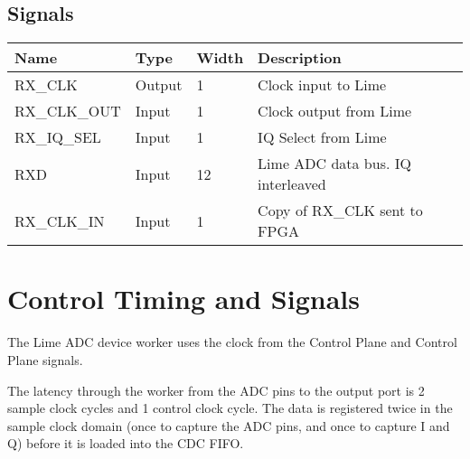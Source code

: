 \begin{landscape}
	\section*{Signals}
	\begin{scriptsize}
		\begin{tabular}{|M{2.5cm}|M{1.5cm}|M{1.5cm}|M{14.5cm}|}
			\hline
			Name         & Type   & Width & Description                       \\
			\hline
			RX\_CLK      & Output & 1     & Clock input to Lime               \\
			\hline
			RX\_CLK\_OUT & Input  & 1     & Clock output from Lime            \\
			\hline
			RX\_IQ\_SEL  & Input  & 1     & IQ Select from Lime               \\
			\hline
			RXD          & Input  & 12    & Lime ADC data bus. IQ interleaved \\
			\hline
			RX\_CLK\_IN  & Input  & 1     & Copy of RX\_CLK sent to FPGA      \\
			\hline
		\end{tabular}
	\end{scriptsize}
\end{landscape}

\section*{Control Timing and Signals}
The Lime ADC device worker uses the clock from the Control Plane and Control Plane signals.\par\bigskip
\noindent The latency through the worker from the ADC pins to the output port is 2 sample clock cycles and 1 control clock cycle. The data is registered twice in the sample clock domain (once to capture the ADC pins, and once to capture I and Q) before it is loaded into the CDC FIFO.

